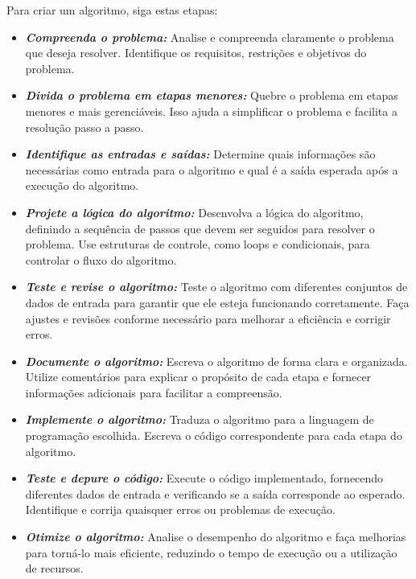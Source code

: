 \documentclass[a4paper, 12pt, onecolumn,singlespacing]{article}
\begin{document}
	Para criar um algoritmo, siga estas etapas:
	
	\begin{itemize}
		
		\item \textbf{\textit{Compreenda o problema:}} Analise e compreenda claramente o problema que deseja resolver. Identifique os requisitos, restrições e objetivos do problema.
		
		\item \textbf{\textit{Divida o problema em etapas menores:}} Quebre o problema em etapas menores e mais gerenciáveis. Isso ajuda a simplificar o problema e facilita a resolução passo a passo.
		
		\item \textbf{\textit{Identifique as entradas e saídas:}} Determine quais informações são necessárias como entrada para o algoritmo e qual é a saída esperada após a execução do algoritmo.
		
		\item \textbf{\textit{Projete a lógica do algoritmo:}} Desenvolva a lógica do algoritmo, definindo a sequência de passos que devem ser seguidos para resolver o problema. Use estruturas de controle, como loops e condicionais, para controlar o fluxo do algoritmo.
		
		\item \textbf{\textit{Teste e revise o algoritmo:}} Teste o algoritmo com diferentes conjuntos de dados de entrada para garantir que ele esteja funcionando corretamente. Faça ajustes e revisões conforme necessário para melhorar a eficiência e corrigir erros.
		
		\item \textbf{\textit{Documente o algoritmo:}} Escreva o algoritmo de forma clara e organizada. Utilize comentários para explicar o propósito de cada etapa e fornecer informações adicionais para facilitar a compreensão.
		
		\item \textbf{\textit{Implemente o algoritmo:}} Traduza o algoritmo para a linguagem de programação escolhida. Escreva o código correspondente para cada etapa do algoritmo.
		
		\item \textbf{\textit{Teste e depure o código:}} Execute o código implementado, fornecendo diferentes dados de entrada e verificando se a saída corresponde ao esperado. Identifique e corrija quaisquer erros ou problemas de execução.
		
		\item \textbf{\textit{Otimize o algoritmo:}} Analise o desempenho do algoritmo e faça melhorias para torná-lo mais eficiente, reduzindo o tempo de execução ou a utilização de recursos.
		
	\end{itemize}
	
\end{document}
